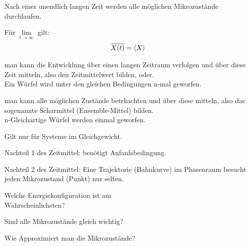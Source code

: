 \begin{notebox}[Bemerkung]\nospacing
      Nach einer unendlich langen Zeit werden alle möglichen Mikrozustände durchlaufen.
\end{notebox}
\begin{lawbox}\nospacing
  \begin{law}[Erdogenhypothese]
    Für $\lim\limits_{t\to\infty}$ gilt:
    \begin{align}
      \overline{X(t)}=\left\langle X\right\rangle\label{eq:ergodenHypothese}
    \end{align}
  \end{law}
\end{lawbox}
\begin{sectionbox}[Schlussfolgerung]\nospacing
  \begin{numberlist}
      \item man kann die Entwicklung über einen langen Zeitraum verfolgen und über diese Zeit mitteln, also den Zeitmittelwert bilden, oder.\\
    Ein Würfel wird unter den gleichen Bedingungen n-mal geworfen.
      \item man kann alle möglichen Zustände betrkachten und über diese mitteln, also das sogenannte Scharmittel (Ensemble-Mittel) bilden.\\
    n-Gleichartige Würfel werden einmal geworfen.
  \end{numberlist}
\end{sectionbox}
\begin{notebox}[Bemerkungen]\nospacing
  \begin{numberlist}
      \item Gilt nur für Systeme im Gleichgewicht.
      \item Nachteil 1 des Zeitmittel: benötigt Anfanfsbedingung.
      \item Nachteil 2 des Zeitmittel: Eine Trajektorie (Bahnkurve) im Phasenraum besucht jeden Mikrozustand (Punkt) nur selten.
  \end{numberlist}
\end{notebox}
\begin{notebox}[Fragen]\nospacing
  \begin{circlelist}
      \item Welche Energiekonfiguration ist am\\ Wahrscheinlichsten?\label{circl:WahrEngKonf}
      \item Sind alle Mikrozustände gleich wichtig?\label{circl:Mikro}
      \item Wie Approximiert man die Mikrozustände?
  \end{circlelist}
\end{notebox}

